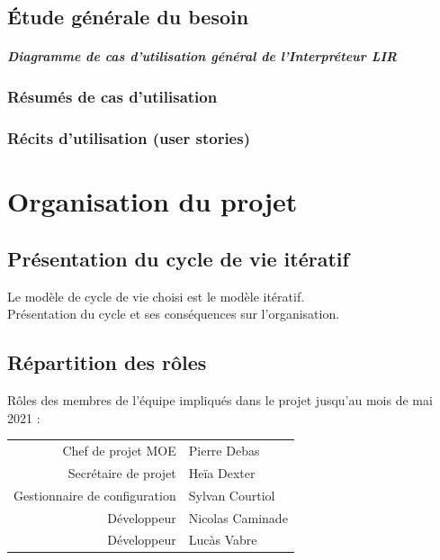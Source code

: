 \documentclass[11pt,a4paper,titlepage,openright]{report}
\begin{document}
    \section{Étude générale du besoin}
    \paragraph{Diagramme de cas d'utilisation général de l'Interpréteur LIR} %

    \subsection{Résumés de cas d'utilisation}


    \subsection{Récits d'utilisation (user stories)}


    \chapter{Organisation du projet}
    \section{Présentation du cycle de vie itératif}
    Le modèle de cycle de vie choisi est le modèle itératif.
    \\Présentation du cycle et ses conséquences sur l’organisation.

    \section{Répartition des rôles}
    Rôles des membres de l’équipe impliqués dans le projet jusqu'au mois de mai 2021 :
    \begin{center}
        \begin{tabular}{rl}
            Chef de projet MOE            & Pierre Debas      \\
            Secrétaire de projet          & Heïa Dexter       \\
            Gestionnaire de configuration & Sylvan Courtiol   \\
            Développeur                   & Nicolas Caminade  \\
            Développeur                   & Lucàs Vabre       \\
        \end{tabular}
    \end{center}
\end{document}

